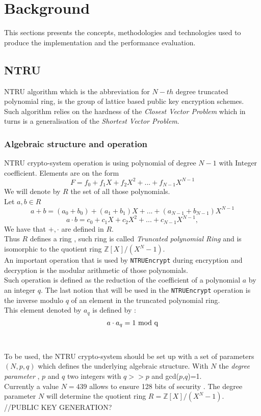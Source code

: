 \section{Background}
\label{sec:background}

This sections presents the concepts, methodologies and technologies used to produce the implementation and the performance evaluation.

\subsection{NTRU}
NTRU algorithm which is the abbreviation for $N-th$ degree truncated polynomial ring, is the group of lattice based public key encryption schemes.\\
Such algorithm relies on the hardness of the \textit{Closest Vector Problem}\cite{micciancio_closest_2003} which in turns is a generalisation of the \textit{Shortest Vector Problem}.
\subsubsection{Algebraic structure and operation}
NTRU crypto-system operation is using polynomial of degree $N-1$ with Integer coefficient. Elements are on the form $$F = f_0+f_1X+f_2X^2+... +f_{N-1}X^{N-1} $$  We will denote by $R$ the set of all those polynomials.\\
Let $a,b \in R$  
$$a+b = (a_0+b_0) + (a_1+b_1)X+...+(a_{N-1}+b_{N-1})X^{N-1}$$
$$ a\cdot b = c_0+c_1X+c_2X^2+...+c_{N-1}X^{N-1}, $$
We have that $+,\cdot $ are defined in $R$. \\Thus $R$ defines a ring , such ring is called \textit{Truncated polynomial Ring} and is isomorphic to the quotient ring $\mathbb{Z}{[X]/(X^N-1)}$.\\
An important operation that is used by \texttt{NTRUEncrypt} during encryption and decryption is the modular arithmetic of those polynomials.\\
Such operation is defined as the reduction of the coefficient of a polynomial $a$ by an integer $q$.
The last notion that will be used in the \texttt{NTRUEncrypt} operation is the inverse modulo $q$ of an element in the truncated polynomial ring.\\ This element denoted by $a_q$ is defined by : $$ a\cdot a_q = 1 \textnormal{ mod q} $$
\\ \\
To be used, the NTRU crypto-system should be set up with a set of parameters $(N,p,q)$ which defines the underlying algebraic structure. With $N$ the \textit{degree parameter} , $p$ and $q$ two integers with $q >> p$ and gcd($p$,$q$)=1.\\ Currently a value $N=439$ allows to ensure 128 bits of security \cite{noauthor_open_2018}. The degree parameter $N$ will determine the quotient ring $R=\mathbb{Z}{[X]/(X^N-1)}$.
\\ //PUBLIC KEY GENERATION?
